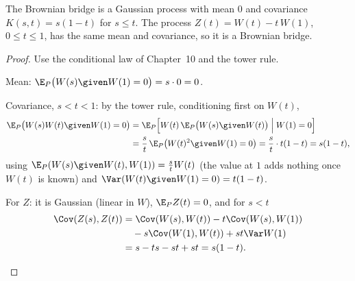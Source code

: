 \begin{theorem}
\label{thm:bridge}
The Brownian bridge is a Gaussian process with mean $0$ and covariance $K(s,t)=s(1-t)$ for $s\le t$. The process $Z(t)=W(t)-t\,W(1)$, $0\le t\le1$, has the same mean and covariance, so it is a Brownian bridge.
\end{theorem}
\begin{proof}
Use the conditional law of Chapter~10 and the tower rule.
\begin{steps}
  \item Mean: $\E_P\big(W(s)\given W(1)=0\big)=s\cdot0=0$.
  \item Covariance, $s<t<1$: by the tower rule, conditioning first on $W(t)$,
  \[
    \begin{aligned}
    \E_P\big(W(s)W(t)\given W(1)=0\big)&=\E_P\Big[W(t)\,\E_P\big(W(s)\given W(t)\big)\Bigm| W(1)=0\Big]\\
    &=\frac st\,\E_P\big(W(t)^2\given W(1)=0\big)=\frac st\cdot t(1-t)=s(1-t),
    \end{aligned}
  \]
  using $\E_P(W(s)\given W(t),W(1))=\frac stW(t)$ (the value at $1$ adds nothing once $W(t)$ is known) and $\Var(W(t)\given W(1)=0)=t(1-t)$.
  \item For $Z$: it is Gaussian (linear in $W$), $\E_PZ(t)=0$, and for $s<t$
  \[
    \begin{aligned}
    \Cov(Z(s),Z(t))&=\Cov(W(s),W(t))-t\Cov(W(s),W(1))\\
    &\quad-s\Cov(W(1),W(t))+st\Var W(1)\\
    &=s-ts-st+st=s(1-t). \qedhere
    \end{aligned}
  \]
\end{steps}
\end{proof}

\begin{pic}
\end{pic}


